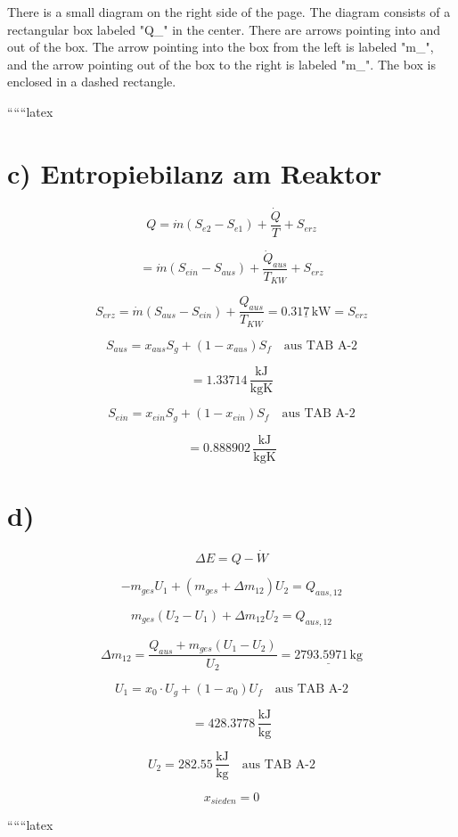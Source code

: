 There is a small diagram on the right side of the page. The diagram consists of a rectangular box labeled "Q_{}" in the center. There are arrows pointing into and out of the box. The arrow pointing into the box from the left is labeled "m_{}", and the arrow pointing out of the box to the right is labeled "m_{}". The box is enclosed in a dashed rectangle.

``````latex


\section*{c) Entropiebilanz am Reaktor}

\[
Q = \dot{m} (S_{e2} - S_{e1}) + \frac{\dot{Q}}{T} + S_{erz}
\]

\[
= \dot{m} (S_{ein} - S_{aus}) + \frac{\dot{Q}_{aus}}{T_{KW}} + S_{erz}
\]

\[
S_{erz} = \dot{m} (S_{aus} - S_{ein}) + \frac{Q_{aus}}{T_{KW}} = \underline{0.317 \, \text{kW}} = S_{erz}
\]

\[
S_{aus} = x_{aus} S_g + (1 - x_{aus}) S_f \quad \text{aus TAB A-2}
\]

\[
= 1.33714 \, \frac{\text{kJ}}{\text{kgK}}
\]

\[
S_{ein} = x_{ein} S_g + (1 - x_{ein}) S_f \quad \text{aus TAB A-2}
\]

\[
= 0.888902 \, \frac{\text{kJ}}{\text{kgK}}
\]

\section*{d)}

\[
\Delta E = Q - \dot{W}
\]

\[
-m_{ges} U_1 + (m_{ges} + \Delta m_{12}) U_2 = Q_{aus, 12}
\]

\[
m_{ges} (U_2 - U_1) + \Delta m_{12} U_2 = Q_{aus, 12}
\]

\[
\Delta m_{12} = \frac{Q_{aus} + m_{ges} (U_1 - U_2)}{U_2} = \underline{2793.5971 \, \text{kg}}
\]

\[
U_1 = x_0 \cdot U_g + (1 - x_0) U_f \quad \text{aus TAB A-2}
\]

\[
= 428.3778 \, \frac{\text{kJ}}{\text{kg}}
\]

\[
U_2 = 282.55 \, \frac{\text{kJ}}{\text{kg}} \quad \text{aus TAB A-2}
\]

\[
x_{sieden} = 0
\]

``````latex


